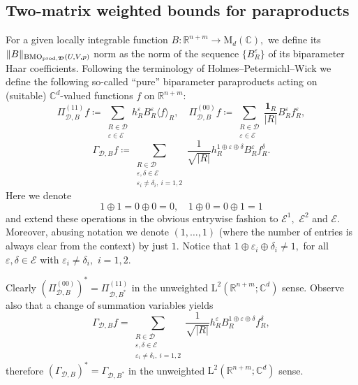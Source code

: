 \documentclass{article}
\theoremstyle{definition}
\theoremstyle{remark}
\numberwithin{equation}{section}
\newcommand{\cE}{\mathcal{E}}
\newcommand{\bfD}{\bm{\mathcal{D}}}
\newcommand{\e}{\varepsilon}
\newcommand{\reals}{\mathbb{R}}
\newcommand{\complex}{\mathbb{C}}
\newcommand{\Lp}[1]{\mathrm{L}^{#1}}
\newcommand{\1}{\mathbf{1}}
\newcommand{\BMOprodD}{\ensuremath\text{BMO}_{\text{prod},\bfD}}
\begin{document}
    \subsection{Two-matrix weighted bounds for paraproducts}
    For a given locally integrable function $B:\reals^{n+m}\to \mathrm{M}_{d}(\complex),$ we define its $\Vert B\Vert_{\BMOprodD(U,V,p)}$ norm
    as the norm of the sequence $\{B_{R}^{\e}\}$ of its biparameter Haar coefficients. Following the terminology of Holmes--Petermichl--Wick \cite[Subsection 6.1]{Holmes_Petermichl_Wick_2018} we define the following so-called ``pure'' biparameter paraproducts acting on (suitable) $\complex^d$-valued functions $f$ on $\reals^{n+m}$:
    \begin{equation*}
        \Pi_{\bfD,B}^{(11)}f\coloneq \sum_{\substack{R\in\bfD\\\e\in\cE}}h^{\e}_{R}B_{R}^{\e}\langle f\rangle_{R},\quad \Pi_{\bfD,B}^{(00)}f\coloneq \sum_{\substack{R\in\bfD\\\e\in\cE}}\frac{\1_{R}}{|R|}B^{\e}_{R}f^{\e}_{R},
    \end{equation*}
    \begin{equation*}
        \Gamma_{\bfD,B}f\coloneq \sum_{\substack{R\in\bfD\\\e,\delta\in\cE\\\e_i\neq\delta_i,~i=1,2}}\frac{1}{\sqrt{|R|}}h_{R}^{1\oplus\e\oplus\delta}B_{R}^{\e}f_{R}^{\delta}.
    \end{equation*}
    Here we denote
    \begin{equation*}
        1\oplus1=0\oplus0=0,\quad 1\oplus0=0\oplus1=1
    \end{equation*}
    and extend these operations in the obvious entrywise fashion to $\cE^1,$ $\cE^2$ and $\cE.$ Moreover, abusing notation we denote $(1,\ldots,1)$ (where the number of entries is always clear from the context) by just $1.$ Notice that $1\oplus\e_i\oplus\delta_i\neq 1,$ for all $\e,\delta\in\cE$ with $\e_i\neq\delta_i,$ $i=1,2.$

    Clearly $(\Pi_{\bfD,B}^{(00)})^{\ast}=\Pi_{\bfD,B^{\ast}}^{(11)}$ in the unweighted $\Lp{2}(\reals^{n+m};\complex^d)$ sense. Observe also that a change of summation variables yields
    \begin{equation*}
        \Gamma_{\bfD,B}f=\sum_{\substack{R\in\bfD\\\e,\delta\in\cE\\\e_i\neq\delta_i,~i=1,2}}\frac{1}{\sqrt{|R|}}h_{R}^{\e}B_{R}^{1\oplus\e\oplus\delta}f_{R}^{\delta},
    \end{equation*}
    therefore $(\Gamma_{\bfD,B})^{\ast}=\Gamma_{\bfD,B^{\ast}}$ in the unweighted $\Lp{2}(\reals^{n+m};\complex^d)$ sense.
\end{document}
